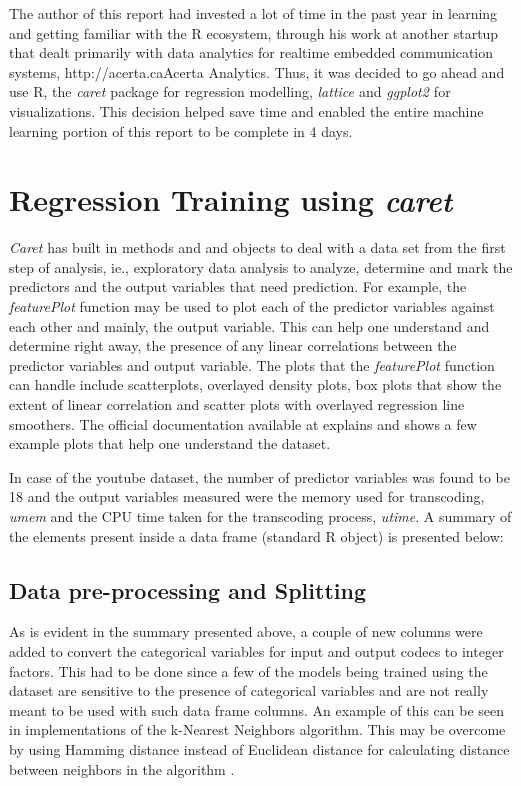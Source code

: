 \documentclass[letterpaper,12pt,titlepage,oneside,final]{report}
\newcommand{\href}[1]{#1} %
\begin{document}
        The author of this report had invested a lot of time in the past year in learning and getting familiar with the R ecosystem, through his work at another startup that dealt primarily with data analytics for realtime embedded communication systems, \href{http://acerta.ca}{Acerta Analytics}. Thus, it was decided to go ahead and use R, the \textit{caret \cite{caretR}} package for regression modelling, \textit{lattice \cite{latticebook}} and \textit{ggplot2 \cite{ggplot2}} for visualizations. This decision helped save time and enabled the entire machine learning portion of this report to be complete in 4 days.

    \section {Regression Training using \textit{caret}}
    \label{regr_train}
        \textit{Caret} has built in methods and and objects to deal with a data set from the first step of analysis, ie., exploratory data analysis to analyze, determine and mark the predictors and the output variables that need prediction. For example, the \textit{featurePlot} function may be used to plot each of the predictor variables against each other and mainly, the output variable. This can help one understand and determine right away, the presence of any linear correlations between the predictor variables and output variable. The plots that the \textit{featurePlot} function can handle include scatterplots, overlayed density plots,  box plots that show the extent of linear correlation and scatter plots with overlayed regression line smoothers. The official documentation available at \cite{Visua58:online} explains and shows a few example plots that help one understand the dataset. 

        In case of the youtube dataset, the number of predictor variables was found to be 18 and the output variables measured were the memory used for transcoding, \textit{umem} and the CPU time taken for the transcoding process, \textit{utime}. A summary of the elements present inside a data frame (standard R object) is presented below:

        \subsection{Data pre-processing and Splitting}
            As is evident in the summary presented above, a couple of new columns were added to convert the categorical variables for input and output codecs to integer factors. This had to be done since a few of the models being trained using the dataset are sensitive to the presence of categorical variables and are not really meant to be used with such data frame columns. An example of this can be seen in implementations of the k-Nearest Neighbors algorithm. This may be overcome by using Hamming distance instead of Euclidean distance for calculating distance between neighbors in the algorithm \cite{KnnW0:online}.
\end{document}

